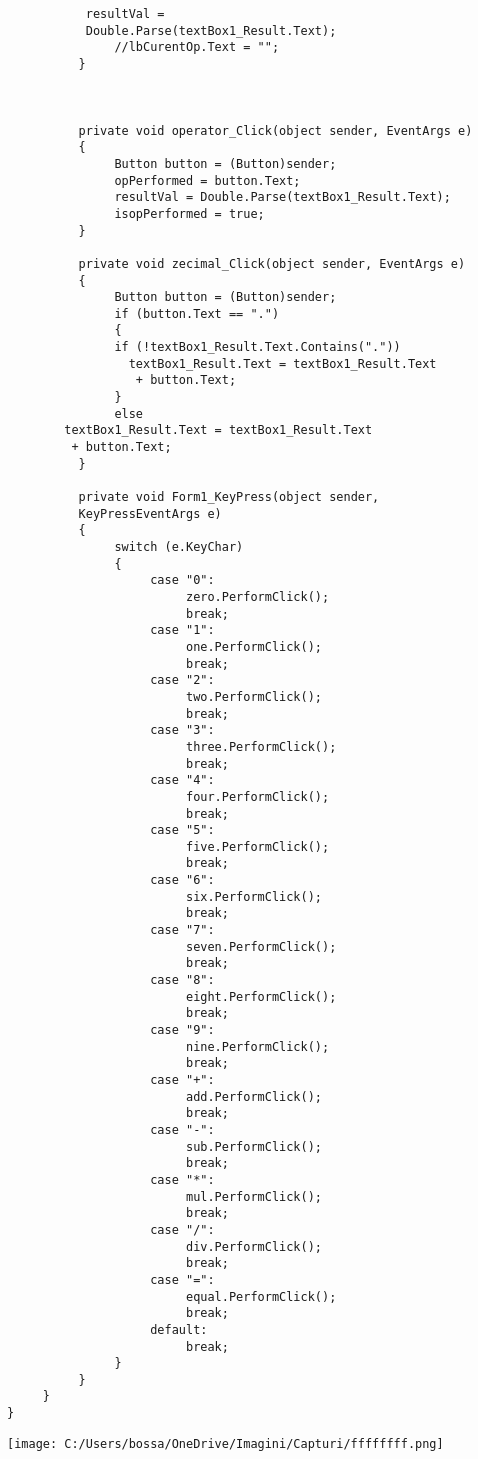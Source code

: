 \documentclass[11pt]{article}
\begin{document}
\begin{lstlisting}
           resultVal = 
           Double.Parse(textBox1_Result.Text);
               //lbCurentOp.Text = "";
          }

       

          private void operator_Click(object sender, EventArgs e)
          {
               Button button = (Button)sender;
               opPerformed = button.Text;
               resultVal = Double.Parse(textBox1_Result.Text);
               isopPerformed = true;
          }

          private void zecimal_Click(object sender, EventArgs e)
          {
               Button button = (Button)sender;
               if (button.Text == ".")
               {
               if (!textBox1_Result.Text.Contains("."))
                 textBox1_Result.Text = textBox1_Result.Text
                  + button.Text;
               }
               else
        textBox1_Result.Text = textBox1_Result.Text
         + button.Text;
          }

          private void Form1_KeyPress(object sender, 
          KeyPressEventArgs e)
          {
               switch (e.KeyChar)
               {
                    case "0":
                         zero.PerformClick();
                         break;
                    case "1":
                         one.PerformClick();
                         break;
                    case "2":
                         two.PerformClick();
                         break;
                    case "3":
                         three.PerformClick();
                         break;
                    case "4":
                         four.PerformClick();
                         break;
                    case "5":
                         five.PerformClick();
                         break;
                    case "6":
                         six.PerformClick();
                         break;
                    case "7":
                         seven.PerformClick();
                         break;
                    case "8":
                         eight.PerformClick();
                         break;
                    case "9":
                         nine.PerformClick();
                         break;
                    case "+":
                         add.PerformClick();
                         break;
                    case "-":
                         sub.PerformClick();
                         break;
                    case "*":
                         mul.PerformClick();
                         break;
                    case "/":
                         div.PerformClick();
                         break;
                    case "=":
                         equal.PerformClick();
                         break;
                    default:
                         break;
               }
          }
     }
}
\end{lstlisting}
\begin{center}


\texttt{[image: C:/Users/bossa/OneDrive/Imagini/Capturi/ffffffff.png]} 
\end{center}
 
\end{document}
